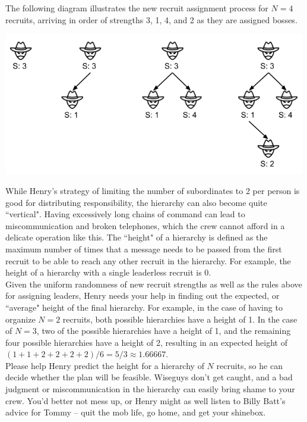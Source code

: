 The following diagram illustrates the new recruit assignment process for $N = 4$ recruits, arriving in order of strengths 3, 1, 4, and 2 as they are assigned bosses.\\

\begin{center}
\includegraphics[width=500px]{wiseguy}
\end{center}

While Henry's strategy of limiting the number of subordinates to 2 per person is good for distributing responsibility, the hierarchy can also become quite ``vertical". Having excessively long chains of command can lead to miscommunication and broken telephones, which the crew cannot afford in a delicate operation like this. The ``height" of a hierarchy is defined as the maximum number of times that a message needs to be passed from the first recruit to be able to reach any other recruit in the hierarchy. For example, the height of a hierarchy with a single leaderless recruit is 0.\\

Given the uniform randomness of new recruit strengths as well as the rules above for assigning leaders, Henry needs your help in finding out the expected, or ``average" height of the final hierarchy. For example, in the case of having to organize $N = 2$ recruits, both possible hierarchies have a height of 1. In the case of $N = 3$, two of the possible hierarchies have a height of 1, and the remaining four possible hierarchies have a height of 2, resulting in an expected height of $(1 + 1 + 2 + 2 + 2 + 2)/6 = 5/3 \approx 1.66667$.\\

Please help Henry predict the height for a hierarchy of $N$ recruits, so he can decide whether the plan will be feasible. Wiseguys don't get caught, and a bad judgment or miscommunication in the hierarchy can easily bring shame to your crew. You'd better not mess up, or Henry might as well listen to Billy Batt's advice for Tommy -- quit the mob life, go home, and get your shinebox.\\

